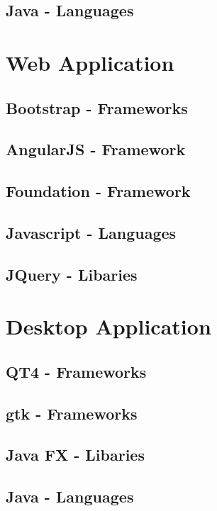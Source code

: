 \subsection{Java - Languages}
           	
\section{Web Application}
		
\subsection{Bootstrap - Frameworks}
\subsection{AngularJS - Framework}
\subsection{Foundation - Framework}

\subsection{Javascript - Languages}

\subsection{JQuery - Libaries}
    
\section{Desktop Application}        

\subsection{QT4 - Frameworks}
\subsection{gtk - Frameworks}

\subsection{Java FX - Libaries}	

\subsection{Java - Languages}
            	 
			
			
			
			